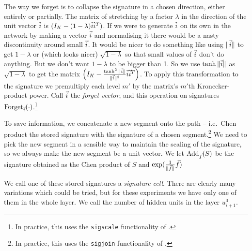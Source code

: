 The way we forget is to collapse the signature in a chosen direction, either entirely or partially. The matrix of stretching by a factor $\lambda$ in the direction of the unit vector $\hat {i}$ is $(I_K-(1-\lambda)\hat {i}\hat {i}^T)$.
If we were to generate $\hat{i}$ on its own in the network by making a vector $\vec {i}$ and normalising it there would be a nasty discontinuity around small $\vec {i}$. It would be nicer to do something like using $\|\vec {i}\|$ to get $1-\lambda$ or (which looks nicer) $\sqrt{1-\lambda}$ so that small values of $\vec {i}$ don't do anything. But we don't want $1-\lambda$ to be bigger than 1. So we use $\tanh \|\vec {i}\|$ as $\sqrt{1-\lambda}$ to get the matrix $\left(I_K-\frac{\tanh^2\|\vec {i}\|}{\|\vec {i}\|^2}\vec {i}\vec {i}^T\right)$.
To apply this transformation to the signature we premultiply each level $m'$ by the matrix's $m'$th Kronecker-product power. Call $\vec {i}$ the \emph{forget-vector}, and this operation on signatures $\text{Forget}_{\vec {i}}(\cdot)$.\footnote{In practice, this uses the \texttt{sigscale} functionality of \ii.}

To save information, we concatenate a new segment onto the path -- i.e.~Chen product the stored signature with the signature of a chosen segment.\footnote{In practice, this uses the \texttt{sigjoin} functionality of \ii.} %
We need to pick the new segment in a sensible way to maintain the scaling of the signature, so we always make the new segment be a unit vector. %
We let $\text{Add}_{\vec {f}}(S)$ be the signature obtained as the Chen product of $S$ and $\exp (\frac1{\|\vec {f}\|}\vec {f})$

We call one of these stored signatures a \emph{signature cell}. There are clearly many variations which could be tried, but for these experiments we have only one of them in the whole layer. We call the number of hidden units in the layer $u_{i+1}^0$. %

